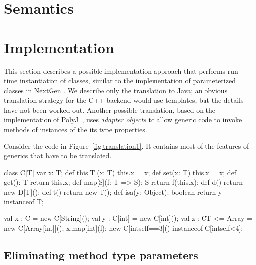 \documentclass{llncs}
\begin{document}
\section{Semantics}



\section{Implementation}

This section describes a possible implementation approach that
performs
run-time instantiation of classes, similar to the implementation
of parameterized classes in NextGen \cite{allen03,allen04}.
We describe only the translation to Java; an obvious
translation strategy for the C++ backend would use templates,
but the details have not been worked out.
Another possible translation, 
based on the implementation of PolyJ~\cite{polyj},
uses \emph{adapter objects} to allow generic code to invoke
methods of instances of the its type properties.

Consider the code in Figure~\ref{fig:translation1}.  It contains most of the 
features of generics that have to be translated.
\begin{figure*}[tp]
\begin{displayxten}
class C[T] {
    var x: T;
    def this[T](x: T) { this.x = x; }
    def set(x: T) { this.x = x; }
    def get(): T { return this.x; }
    def map[S](f: T => S): S { return f(this.x); }
    def d() { return new D[T](); }
    def t() { return new T(); }
    def isa(y: Object): boolean { return y instanceof T; }
}

val x : C = new C[String]();
val y : C[int] = new C[int]();
val z : C{T <= Array} = new C[Array[int]]();
x.map[int](f);
new C[int{self==3}]() instanceof C[int{self<4}];
\end{displayxten}
\caption{Code to translate}
\label{fig:translation1}
\end{figure*}

\subsection{Eliminating method type parameters}
\end{document}
